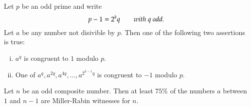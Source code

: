 \begin{proposition}
	Let $p$ be an odd prime and write
	\[p-1=2^kq\qquad\text{\textit{with $q$ odd.}}\]
	Let $a$ be any number not disivible by $p$. Then one of the following two assertions is true: 
	\begin{enumerate}[(i)]
		\item $a^q$ is congruent to $1$ modulo $p$. 
		\item One of $a^q, a^{2q}, a^{4q}, \dots, a^{2^{k-1}q}$ is congruent to $-1$ modulo $p$. 
	\end{enumerate}
\end{proposition}

\begin{proposition}
	Let $n$ be an odd composite number. Then at least $75\%$ of the numbers $a$ between $1$ and $n-1$ are Miller-Rabin witnesses for $n$. 
\end{proposition}
